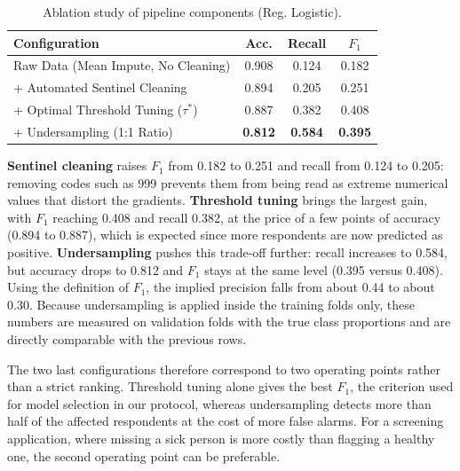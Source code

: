 \documentclass[10pt,conference,compsocconf]{IEEEtran}
\begin{document}
\begin{table}[htbp]
\centering
\caption{Ablation study of pipeline components (Reg. Logistic).}
\label{tab:ablation}
\setlength{\tabcolsep}{4pt}
\begin{tabular}{lccc}
\toprule
\textbf{Configuration} & \textbf{Acc.} & \textbf{Recall} & \textbf{$F_1$} \\
\midrule
Raw Data (Mean Impute, No Cleaning) & 0.908 & 0.124 & 0.182 \\
+ Automated Sentinel Cleaning & 0.894 & 0.205 & 0.251 \\
+ Optimal Threshold Tuning ($\tau^*$) & 0.887 & 0.382 & 0.408 \\
+ Undersampling (1:1 Ratio) & \textbf{0.812} & \textbf{0.584} & \textbf{0.395} \\
\bottomrule
\end{tabular}
\end{table}
 
\textbf{Sentinel cleaning} raises $F_1$ from 0.182 to 0.251 and recall from 0.124 to 0.205: removing codes such as 999 prevents them from being read as extreme numerical values that distort the gradients. \textbf{Threshold tuning} brings the largest gain, with $F_1$ reaching 0.408 and recall 0.382, at the price of a few points of accuracy (0.894 to 0.887), which is expected since more respondents are now predicted as positive. \textbf{Undersampling} pushes this trade-off further: recall increases to 0.584, but accuracy drops to 0.812 and $F_1$ stays at the same level (0.395 versus 0.408). Using the definition of $F_1$, the implied precision falls from about 0.44 to about 0.30. Because undersampling is applied inside the training folds only, these numbers are measured on validation folds with the true class proportions and are directly comparable with the previous rows.
 
The two last configurations therefore correspond to two operating points rather than a strict ranking. Threshold tuning alone gives the best $F_1$, the criterion used for model selection in our protocol, whereas undersampling detects more than half of the affected respondents at the cost of more false alarms. For a screening application, where missing a sick person is more costly than flagging a healthy one, the second operating point can be preferable.
 
\end{document}
